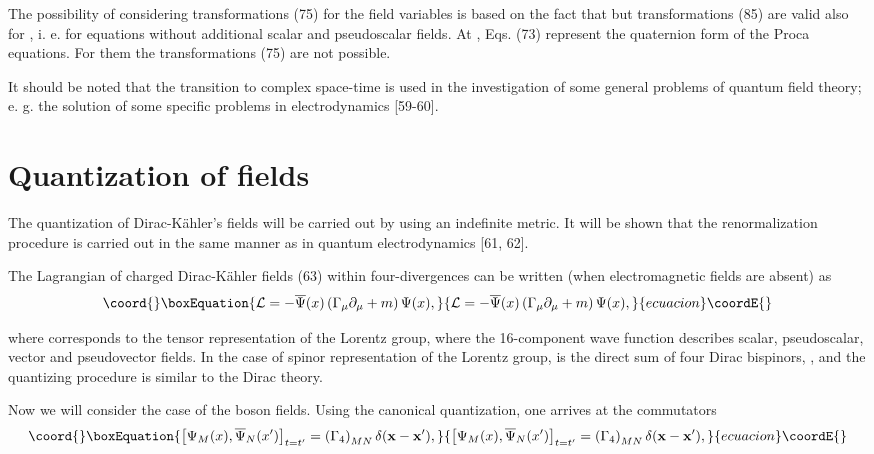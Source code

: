 \documentclass[a4paper,12pt]{article}
\begin{document}
The possibility of considering transformations (75) for the field
variables is based on the fact that
\coordHE{} but transformations (85)
are valid also for \coordHE{}, i. e. for equations without additional
scalar and pseudoscalar fields. At \coordHE{}, \coordHE{} Eqs. (73)
represent the quaternion form of the Proca equations. For them the
transformations (75) are not possible.

It should be noted that the transition to complex space-time is used in the
investigation of some general problems of quantum field theory; e. g. the
solution of some specific problems in electrodynamics [59-60].

\section{Quantization of fields}

The quantization of Dirac-K\"ahler's fields will be carried out by using an
indefinite metric. It will be shown that the renormalization procedure is
carried out in the same manner as in quantum electrodynamics [61, 62].

The Lagrangian of charged Dirac-K\"ahler fields (63) within four-divergences
can be written (when electromagnetic fields are absent) as
\begin{equation}\coord{}\boxEquation{
\mathcal{L}=-\overline{\Psi }(x)\left( \Gamma _\mu \partial _\mu
+m\right) \Psi (x) , \label{86}
}{
\mathcal{L}=-\overline{\Psi }(x)\left( \Gamma _\mu \partial _\mu
+m\right) \Psi (x) , }{ecuacion}\coordE{}\end{equation}

where \coordHE{} corresponds to the tensor representation of the Lorentz
group, where the 16-component wave function \myHighlight{$\Psi $}\coordHE{} describes
scalar, pseudoscalar, vector and pseudovector fields. In the case
of spinor representation of the Lorentz group, \myHighlight{$\Psi $}\coordHE{} is the
direct sum of four Dirac bispinors, \coordHE{}, and the quantizing procedure is similar to the
Dirac theory.

Now we will consider the case of the boson fields. Using the canonical
quantization, one arrives at the commutators
\begin{equation}\coord{}\boxEquation{
\left[ \Psi _M(x),\overline{\Psi }_N(x^{\prime })\right]
_{t=t^{\prime }}=\left( \Gamma _4\right) _{MN}\delta
(\mathbf{x}-\mathbf{x}^{\prime }) ,\label{87}
}{
\left[ \Psi _M(x),\overline{\Psi }_N(x^{\prime })\right]
_{t=t^{\prime }}=\left( \Gamma _4\right) _{MN}\delta
(\mathbf{x}-\mathbf{x}^{\prime }) ,}{ecuacion}\coordE{}\end{equation}
\end{document}
